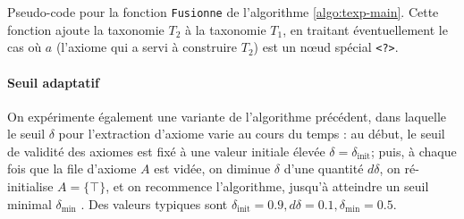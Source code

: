 \begin{algorithm}
\caption{Pseudo-code pour la fonction \texttt{Fusionne} de l'algorithme \ref{algo:texp-main}. Cette fonction ajoute la taxonomie $T_2$ à la taxonomie $T_1$, en traitant éventuellement le cas où $a$ (l'axiome qui a servi à construire $T_2$) est un nœud spécial \texttt{<?>}.}
\label{algo:texp-trouve}
\end{algorithm}



\paragraph{Seuil adaptatif} On expérimente également une variante de l'algorithme précédent, dans laquelle le seuil $\delta$ pour l'extraction d'axiome varie au cours du temps : au début, le seuil de validité des axiomes est fixé à une valeur initiale élevée $\delta = \delta_\text{init}$; puis, à chaque fois que la file d'axiome $A$ est vidée, on diminue $\delta$ d'une quantité $d\delta$, on ré-initialise $A = \{ \top \}$, et on recommence l'algorithme, jusqu'à atteindre un seuil minimal $\delta_\text{min}$ . Des valeurs typiques sont $\delta_\text{init} = 0.9, d\delta = 0.1, \delta_\text{min} = 0.5$.

